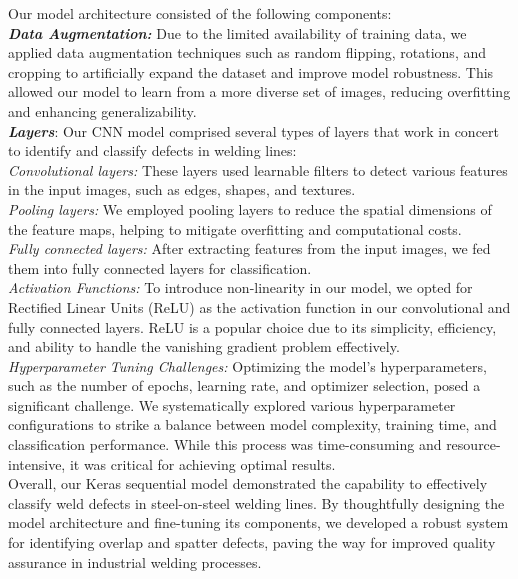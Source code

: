 \documentclass{article_saj}
\begin{document}
\indent Our model architecture consisted of the following components:\\

\indent \textbf{\textit{Data Augmentation:}} Due to the limited availability of training data, we applied data augmentation techniques such as random flipping, rotations, and cropping to artificially expand the dataset and improve model robustness. This allowed our model to learn from a more diverse set of images, reducing overfitting and enhancing generalizability.\\

\indent \textbf{\textit{Layers}}: Our CNN model comprised several types of layers that work in concert to identify and classify defects in welding lines:\\

\indent \textit{Convolutional layers:} These layers used learnable filters to detect various features in the input images, such as edges, shapes, and textures.\\
\indent \textit{Pooling layers:} We employed pooling layers to reduce the spatial dimensions of the feature maps, helping to mitigate overfitting and computational costs.\\
\indent \textit{Fully connected layers:} After extracting features from the input images, we fed them into fully connected layers for classification.\\
 \indent \textit{Activation Functions:} To introduce non-linearity in our model, we opted for Rectified Linear Units (ReLU) as the activation function in our convolutional and fully connected layers. ReLU is a popular choice due to its simplicity, efficiency, and ability to handle the vanishing gradient problem effectively.\\
 
 \indent \textit{Hyperparameter Tuning Challenges:} Optimizing the model's hyperparameters, such as the number of epochs, learning rate, and optimizer selection, posed a significant challenge. We systematically explored various hyperparameter configurations to strike a balance between model complexity, training time, and classification performance. While this process was time-consuming and resource-intensive, it was critical for achieving optimal results.\\

\indent
Overall, our Keras sequential model demonstrated the capability to effectively classify weld defects in steel-on-steel welding lines. By thoughtfully designing the model architecture and fine-tuning its components, we developed a robust system for identifying overlap and spatter defects, paving the way for improved quality assurance in industrial welding processes.\\
\end{document}
